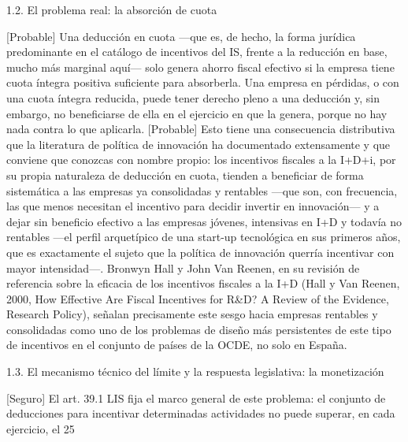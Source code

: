 \documentclass[10pt,a4paper]{article}
\begin{document}
1.2. El problema real: la absorción de cuota

[Probable] Una deducción en cuota —que es, de hecho, la forma jurídica predominante en el catálogo de incentivos del IS, frente a la reducción en base, mucho más marginal aquí— solo genera ahorro fiscal efectivo si la empresa tiene cuota íntegra positiva suficiente para absorberla. Una empresa en pérdidas, o con una cuota íntegra reducida, puede tener derecho pleno a una deducción y, sin embargo, no beneficiarse de ella en el ejercicio en que la genera, porque no hay nada contra lo que aplicarla. [Probable] Esto tiene una consecuencia distributiva que la literatura de política de innovación ha documentado extensamente y que conviene que conozcas con nombre propio: los incentivos fiscales a la I+D+i, por su propia naturaleza de deducción en cuota, tienden a beneficiar de forma sistemática a las empresas ya consolidadas y rentables —que son, con frecuencia, las que menos necesitan el incentivo para decidir invertir en innovación— y a dejar sin beneficio efectivo a las empresas jóvenes, intensivas en I+D y todavía no rentables —el perfil arquetípico de una start-up tecnológica en sus primeros años, que es exactamente el sujeto que la política de innovación querría incentivar con mayor intensidad—. Bronwyn Hall y John Van Reenen, en su revisión de referencia sobre la eficacia de los incentivos fiscales a la I+D (Hall y Van Reenen, 2000, How Effective Are Fiscal Incentives for R&D? A Review of the Evidence, Research Policy), señalan precisamente este sesgo hacia empresas rentables y consolidadas como uno de los problemas de diseño más persistentes de este tipo de incentivos en el conjunto de países de la OCDE, no solo en España.

1.3. El mecanismo técnico del límite y la respuesta legislativa: la monetización

[Seguro] El art. 39.1 LIS fija el marco general de este problema: el conjunto de deducciones para incentivar determinadas actividades no puede superar, en cada ejercicio, el 25%
\end{document}
